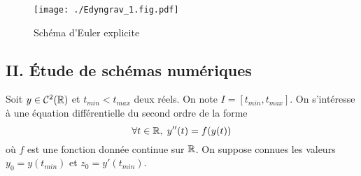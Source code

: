 \begin{figure}[h]
  \centering
  \texttt{[image: ./Edyngrav\_1.fig.pdf]}
  \caption{Schéma d'Euler explicite}
  \label{fig:Edyngrav_1}
\end{figure}


\subsection*{II. \'Etude de schémas numériques}
Soit $y \in \mathcal{C}^2(\mathbb{R})$ et $t_{min} < t_{max}$ deux réels. On note $I = \left[t_{min}, t_{max} \right]$. On s'intéresse à une équation différentielle du second ordre de la forme
\begin{equation}
  \forall t \in \mathbb{R}, \; y''(t) = f(y(t)) \label{eqdif}
\end{equation}
où $f$ est une fonction donnée continue sur $\mathbb{R}$.\newline
On suppose connues les valeurs $y_0=y(t_{min})$ et $z_0=y'(t_{min})$.
